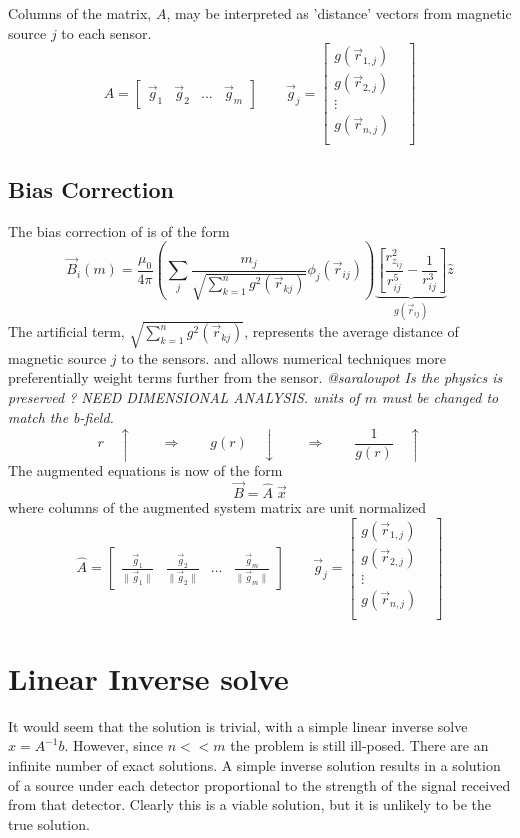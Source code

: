 \documentclass[a4paper]{article}
\begin{document}
Columns of the matrix, $A$, may be interpreted as 'distance' vectors  from
magnetic source $j$ to each sensor.
\[
A = 
\begin{bmatrix}
 \vec{g}_1
 &
 \vec{g}_2
 &
 ...
 &
 \vec{g}_m
\end{bmatrix}
\qquad
\vec{g}_j
 = 
\begin{bmatrix} 
g(\vec{r}_{1,j}) & \\
g(\vec{r}_{2,j}) & \\
\vdots           & \\
g(\vec{r}_{n,j}) & \\
\end{bmatrix} 
\]


\subsection{Bias Correction }
The bias correction of \cite{Gorodnitsky} is of the form
 \[
\vec{B}_i(m)=\frac{\mu_{0}}{4\pi}
  \left(\sum_j  \frac{m_j}{\sqrt{\sum_{k=1}^n  g^2 (\vec{r}_{kj})}}  \phi_j(\vec{r}_{ij})\right)
  \underbrace{
   \left[
       \frac{r_{z_{ij}}^{2}}{r^{5}_{ij}}-\frac{1}{r^{3}_{ij}}
   \right]
   }_{g(\vec{r}_{ij})}
 \hat{z}
\]
The artificial term, $\sqrt{\sum_{k=1}^n  g^2 (\vec{r}_{kj})}$,
represents the average distance of magnetic source $j$ to the sensors.
 and allows numerical techniques more preferentially weight terms further from the sensor.
\textit{\color{red} @saraloupot
Is the physics is preserved ? NEED DIMENSIONAL ANALYSIS.
units of $m$ must be changed to match the b-field. } 
\[
  r \quad \uparrow 
\qquad \Rightarrow \qquad
  g(r) \quad \downarrow 
\qquad \Rightarrow \qquad
  \frac{1}{g(r)} \quad \uparrow 
\]
The augmented equations is now of the form
\[
\vec{B} = \hat{A} \; \vec{x}
\]
where columns of the augmented system matrix are unit normalized
\[
\hat{A} = 
\begin{bmatrix}
 \frac{\vec{g}_1}{\|\vec{g}_1\|}
 &
 \frac{\vec{g}_2}{\|\vec{g}_2\|}
 &
 ...
 &
 \frac{\vec{g}_m}{\|\vec{g}_m\|}
\end{bmatrix}
\qquad
\vec{g}_j
 = 
\begin{bmatrix} 
g(\vec{r}_{1,j}) & \\
g(\vec{r}_{2,j}) & \\
\vdots           & \\
g(\vec{r}_{n,j}) & \\
\end{bmatrix} 
\]


\section{Linear Inverse solve}
It would seem that the solution is trivial, with a simple linear inverse solve $x=A^{-1}b$.  However, since $n<<m$ the problem is still ill-posed.  There are an infinite number of exact solutions.  A simple inverse solution results in a solution of a source under each detector proportional to the strength of the signal received from that detector.  Clearly this is a viable solution, but it is unlikely to be the true solution.  
\end{document}
